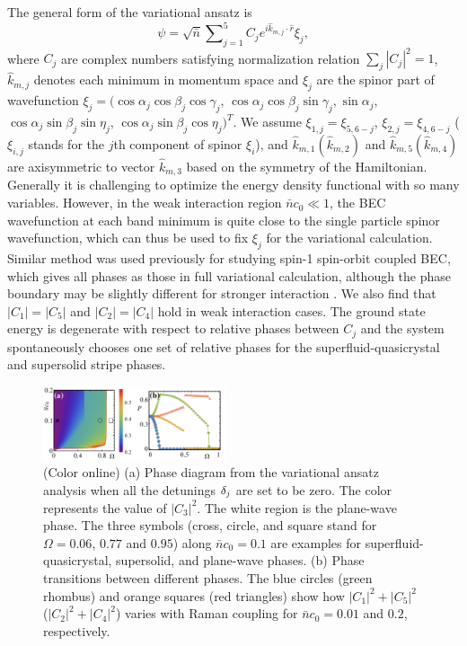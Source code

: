 \documentclass[twocolumn,prl,floatfix,citeautoscript,nofootinbib]{revtex4}
\begin{document}
The general form of the variational ansatz is
\begin{equation}
\psi =\sqrt{\bar{n}}\sum\nolimits_{j=1}^{5}C_{j}e^{i\hat{k}_{m,j}\cdot \hat{r%
}}\xi _{j},
\end{equation}%
where $C_{j}$ are complex numbers satisfying normalization relation $%
\sum_{j}|C_{j}|^{2}=1$, $\hat{k}_{m,j}$ denotes each minimum in momentum
space and $\xi _{j}$ are the spinor part of wavefunction $\xi _{j}=(\cos
\alpha _{j}\cos \beta _{j}\cos \gamma _{j}$, $\cos \alpha _{j}\cos \beta
_{j}\sin \gamma _{j}$,$~\sin \alpha _{j}$, $\cos \alpha _{j}\sin \beta
_{j}\sin \eta _{j}$, $\cos \alpha _{j}\sin \beta _{j}\cos \eta _{j})^{T}$.
We assume $\xi _{1,j}=\xi _{5,6-j}$, $\xi _{2,j}=\xi _{4,6-j}$ ($\xi _{i,j}$
stands for the $j$th component of spinor $\xi _{i}$), and $\hat{k}_{m,1}(%
\hat{k}_{m,2})$ and $\hat{k}_{m,5}(\hat{k}_{m,4})$ are axisymmetric to
vector $\hat{k}_{m,3}$ based on the symmetry of the Hamiltonian. Generally
it is challenging to optimize the energy density functional with so many
variables. However, in the weak interaction region $\bar{n}c_{0}\ll 1$, the
BEC wavefunction at each band minimum is quite close to the single particle
spinor wavefunction, which can thus be used to fix $\xi _{j}$ for the
variational calculation. Similar method was used previously for studying
spin-1 spin-orbit coupled BEC, which gives all phases as those in full
variational calculation, although the phase boundary may be slightly
different for stronger interaction \cite{Luo2017}. We also find that $%
\left\vert C_{1}\right\vert =\left\vert C_{5}\right\vert $ and $\left\vert
C_{2}\right\vert =\left\vert C_{4}\right\vert $ hold in weak interaction
cases. The ground state energy is degenerate with respect to relative phases
between $C_{j}$ and the system spontaneously chooses one set of relative
phases for the superfluid-quasicrystal and supersolid stripe phases.

\begin{figure}[t]
\centering
\includegraphics[width=0.48\textwidth]{Fig3.pdf}
\caption{(Color online) (a) Phase diagram from the variational ansatz
analysis when all the detunings $\protect\delta_j$ are set to be zero. The
color represents the value of $|C_{3}|^{2}$. The white region is the
plane-wave phase. The three symbols (cross, circle, and square stand for $%
\Omega =0.06$, $0.77$ and $0.95 $) along $\bar{n}c_{0}=0.1$ are examples for
superfluid-quasicrystal, supersolid, and plane-wave phases. (b) Phase
transitions between different phases. The blue circles (green rhombus) and
orange squares (red triangles) show how $|C_{1}|^{2}+|C_{5}|^{2}$ ($%
|C_{2}|^{2}+|C_{4}|^{2}$) varies with Raman coupling for $\bar{n}c_{0}=0.01$
and $0.2$, respectively.}
\label{fig3}
\end{figure}
\end{document}
